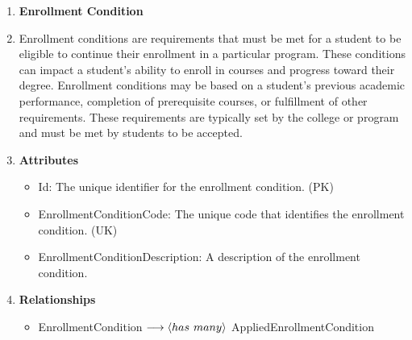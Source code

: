 \documentclass[12pt]{article}
\begin{document}
\begin{appendices}
\begin{enumerate}[label=(\roman*)]
    \item \textbf{Enrollment Condition}
    \item[] Enrollment conditions are requirements that must be met for a student to be eligible to continue their enrollment in a particular program. These conditions can impact a student's ability to enroll in courses and progress toward their degree. Enrollment conditions may be based on a student's previous academic performance, completion of prerequisite courses, or fulfillment of other requirements. These requirements are typically set by the college or program and must be met by students to be accepted.
    \item[] \textbf{Attributes}
    \begin{itemize}
        \item Id: The unique identifier for the enrollment condition. (PK)
        \item EnrollmentConditionCode: The unique code that identifies the enrollment condition. (UK)
        \item EnrollmentConditionDescription: A description of the enrollment condition.
    \end{itemize}
    \item[] \textbf{Relationships}
    \begin{itemize}
        \item EnrollmentCondition $ \longrightarrow \langle has \hspace{0.125cm} many \rangle $ AppliedEnrollmentCondition
    \end{itemize}


\end{enumerate}
\end{appendices}
\end{document}
